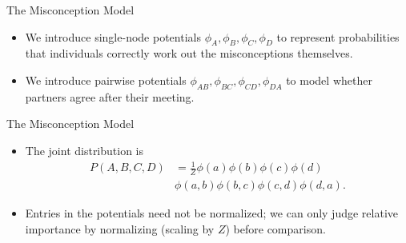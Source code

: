 \documentclass[11pt]{beamer}
\begin{document}
\begin{frame}{The Misconception Model \cite{pgmslides}}
\setlength{\topsep}{0pt}
\setlength{\partopsep}{0pt}
\vspace{0pt}
\centering
\begin{figure}[!t]
\resizebox{0.3\textwidth}{!}{\misconceptionmrf}
\end{figure}
\begin{itemize}
	\item We introduce single-node potentials $\phi_{A}, \phi_{B}, \phi_{C},
	\phi_{D}$ to represent probabilities that individuals correctly work out
	the misconceptions themselves.
	\item We introduce pairwise potentials $\phi_{AB}, \phi_{BC}, \phi_{CD},
	\phi_{DA}$ to model whether partners agree after their meeting.
\end{itemize}
\end{frame}

\begin{frame}{The Misconception Model \cite{pgmslides}}
\begin{itemize}
	\item The joint distribution is
	\begin{align*}
		P(A,B,C,D) &= \frac{1}{Z}\phi(a)\phi(b)\phi(c)\phi(d) \\
		&\phi(a,b)\phi(b,c)\phi(c,d)\phi(d,a).
	\end{align*}
	\item Entries in the potentials need not be normalized; we can only
	judge relative importance by normalizing (scaling by $Z$) before
	comparison.
\end{itemize}
\end{frame}
\end{document}

